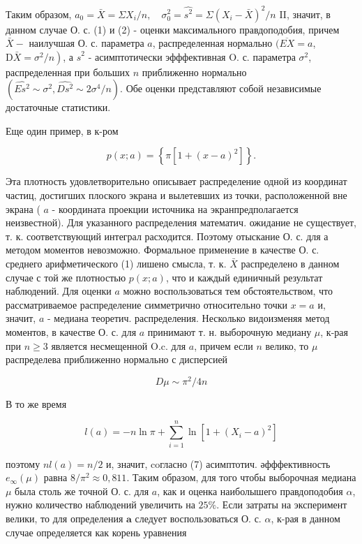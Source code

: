 \documentclass[10pt]{article}
\begin{document}
Таким образом, $a_{0}=\bar{X}=\Sigma X_{i} / n, \quad \sigma_{0}^{2}=\hat{s^{2}}=\Sigma\left(X_{i}-\bar{X}\right)^{2} / n$ II, значит, в данном случае О. с. (1) и (2) - оценки максимального правдоподобия, причем $\bar{X}-$ наилучшая О. с. параметра $a$, распределенная нормально $(\overline{E X}=a$, $\left.\mathrm{D} \bar{X}=\sigma^{2} / n\right)$, а $\hat{s}^{2}$ - асимптотически эфффективная O. с. параметра $\sigma^{2}$, распределенная при больших $n$ приближенно нормально $\left(\hat{E s^{2}} \sim \sigma^{2}, \widehat{D s^{2}} \sim 2 \sigma^{4} / n\right)$. Обе оценки представляют собой независимые достаточные статистики.

Еще один пример, в к-ром

\[
p(x ; a)=\left\{\pi\left[1+(x-a)^{2}\right]\right\} .
\]

Эта плотность удовлетворительно описывает распределение одной из координат частиц, достигших плоского экрана и вылетевших из точки, расположенной вне экрана ( $a$ - координата проекции источника на экранпредполагается неизвестной). Для указанного распределения математич. ожидание не существует, т. к. соответствующий интеграл расходится. Поэтому отыскание О. с. для а методом моментов невозможно. Формальное применение в качестве О. с. среднего арифметического (1) лишено смысла, т. к. $\bar{X}$ распределено в данном случае с той же плотностью $p(x ; a)$, что и каждый единичный результат наблюдений. Для оценки $a$ можно воспользоваться тем обстоятельством, что рассматриваемое распределение симметрично относительно точки $x=a$ и, значит, $a$ - медиана теоретич. распределения. Несколько видоизменяя метод моментов, в качестве О. с. для $a$ принимают т. н. выборочную медиану $\mu$, к-рая при $n \geqslant 3$ является несмещенной $\mathrm{O} . \mathrm{c}$. для $a$, причем если $n$ велико, то $\mu$ распределева приближенно нормально с дисперсией

\[
D \mu \sim \pi^{2} / 4 n
\]

В то же время

\[
l(a)=-n \ln \pi+\sum_{i=1}^{n} \ln \left[1+\left(X_{i}-a\right)^{2}\right]
\]

поэтому $n l(a)=n / 2$ и, значит, coгласно (7) асимптотич. әфффективность $e_{\infty}(\mu)$ равна $8 / \pi^{2} \approx 0,811$. Таким образом, для того чтобы выборочная медиана $\mu$ была столь же точной О. с. для $a$, как и оценка наиболышего правдоподобия $\alpha$, нужно количество наблюдений увеличить на $25 \%$. Если затраты на эксперимент велики, то для определения $\boldsymbol{a}$ следует воспользоваться О. с. $\alpha$, к-рая в данном случае определяется как корень уравнения
\end{document}
